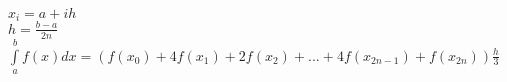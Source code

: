 $x_i = a + ih$ \\
$h = \frac{b - a}{2n}$ \\
$\int\limits_a^b f(x)dx = (f(x_0) + 4f(x_1) + 2f(x_2) + ... + 4f(x_{2n-1}) + f(x_{2n}))\frac{h}{3}$ \\
